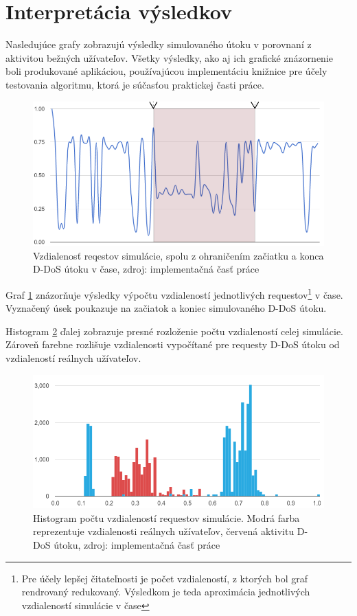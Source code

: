 \documentclass[
  digital, %
  table,   %
  lof,     %
  nolot,   %
  nocover
]{fithesis3}
\begin{document}
\section{Interpretácia výsledkov}
Nasledujúce grafy zobrazujú výsledky simulovaného útoku v porovnaní z aktivitou
bežných užívateľov. Všetky výsledky, ako aj ich grafické znázornenie boli
produkované aplikáciou, používajúcou implementáciu knižnice pre účely testovania
algoritmu, ktorá je súčasťou praktickej časti práce.

\begin{figure}[H]
  \centering
    \includegraphics[width=.95\textwidth]{images/data-flow.png}
  \caption{Vzdialenosť reqestov simulácie, spolu z ohraničením začiatku a konca
  D-DoS útoku v čase, zdroj: implementačná časť práce}
  \label{fig:data-flow}
\end{figure}

Graf \ref{fig:data-flow} znázorňuje výsledky výpočtu vzdialeností jednotlivých
requestov\footnote{Pre účely lepšej čitateľnosti je počet vzdialeností, z
ktorých bol graf rendrovaný redukovaný. Výsledkom je teda aproximácia
jednotlivých vzdialeností simulácie v čase} v čase. Vyznačený úsek poukazuje na
začiatok a koniec simulovaného D-DoS útoku.

Histogram \ref{fig:data-histogram} ďalej zobrazuje presné rozloženie počtu
vzdialeností celej simulácie. Zároveň farebne rozlišuje vzdialenosti vypočítané
pre requesty D-DoS útoku od vzdialeností reálnych užívateľov. 

\begin{figure}[h]
  \centering
    \includegraphics[width=\textwidth]{images/data-histogram.png}
  \caption{Histogram počtu vzdialeností requestov simulácie. Modrá farba
  reprezentuje vzdialenosti reálnych užívateľov, červená aktivitu D-DoS útoku,
  zdroj: implementačná časť práce}
  \label{fig:data-histogram}
\end{figure}
\end{document}
